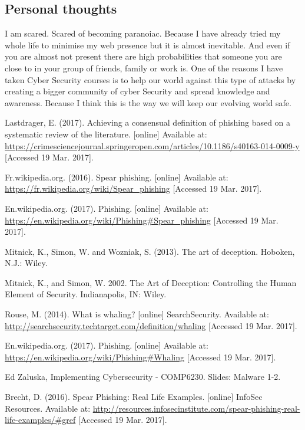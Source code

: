 \documentclass[12pt]{article} %
\begin{document}
\subsection{Personal thoughts}
I am scared. Scared of becoming paranoiac. Because I have already tried my whole life to minimise my web presence but it is almost inevitable. And even if you are almost not present there are high probabilities that someone you are close to in your group of friends, family or work is. One of the reasons I have taken Cyber Security courses is to help our world against this type of attacks by creating a bigger community of cyber Security and spread knowledge and awareness. Because I think this is the way we will keep our evolving world safe.
\newpage
\begin{thebibliography}{99}
 Lastdrager, E. (2017). Achieving a consensual definition of phishing based on a systematic review of the literature. [online] Available at: \url{https://crimesciencejournal.springeropen.com/articles/10.1186/s40163-014-0009-y} [Accessed 19 Mar. 2017].

 Fr.wikipedia.org. (2016). Spear phishing. [online] Available at: \url{https://fr.wikipedia.org/wiki/Spear_phishing} [Accessed 19 Mar. 2017].

 En.wikipedia.org. (2017). Phishing. [online] Available at: \url{https://en.wikipedia.org/wiki/Phishing#Spear_phishing} [Accessed 19 Mar. 2017].

 Mitnick, K., Simon, W. and Wozniak, S. (2013). The art of deception. Hoboken, N.J.: Wiley.

 Mitnick, K., and Simon, W. 2002. 
The Art of Deception: Controlling the Human Element of Security. Indianapolis, IN: Wiley.

 Rouse, M. (2014). What is whaling? [online] SearchSecurity. Available at: \url{http://searchsecurity.techtarget.com/definition/whaling} [Accessed 19 Mar. 2017].

 En.wikipedia.org. (2017). Phishing. [online] Available at: \url{https://en.wikipedia.org/wiki/Phishing#Whaling} [Accessed 19 Mar. 2017].

 Ed Zaluska, Implementing Cybersecurity - COMP6230. Slides: Malware 1-2.

 Brecht, D. (2016). Spear Phishing: Real Life Examples. [online] InfoSec Resources. Available at: \url{http://resources.infosecinstitute.com/spear-phishing-real-life-examples/#gref} [Accessed 19 Mar. 2017].


\end{thebibliography}
\end{document}
